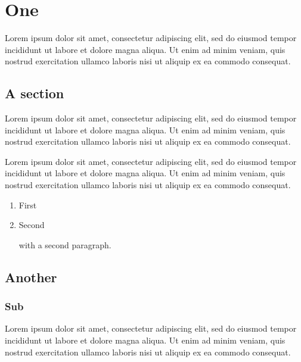 \documentclass[11pt]{report}
\begin{document}
\tableofcontents
\chapter{One}
Lorem ipsum dolor sit amet, consectetur adipiscing elit, sed do eiusmod tempor incididunt ut labore et dolore magna aliqua. Ut enim ad minim veniam, quis nostrud exercitation ullamco laboris nisi ut aliquip ex ea commodo consequat.
\section{A section}
Lorem ipsum dolor sit amet, consectetur adipiscing elit, sed do eiusmod tempor incididunt ut labore et dolore magna aliqua. Ut enim ad minim veniam, quis nostrud exercitation ullamco laboris nisi ut aliquip ex ea commodo consequat.

Lorem ipsum dolor sit amet, consectetur adipiscing elit, sed do eiusmod tempor incididunt ut labore et dolore magna aliqua. Ut enim ad minim veniam, quis nostrud exercitation ullamco laboris nisi ut aliquip ex ea commodo consequat.
\begin{enumerate}\item First\item Second

with a second paragraph.\end{enumerate}
\section{Another}
\subsection{Sub}
Lorem ipsum dolor sit amet, consectetur adipiscing elit, sed do eiusmod tempor incididunt ut labore et dolore magna aliqua. Ut enim ad minim veniam, quis nostrud exercitation ullamco laboris nisi ut aliquip ex ea commodo consequat.
\end{document}
